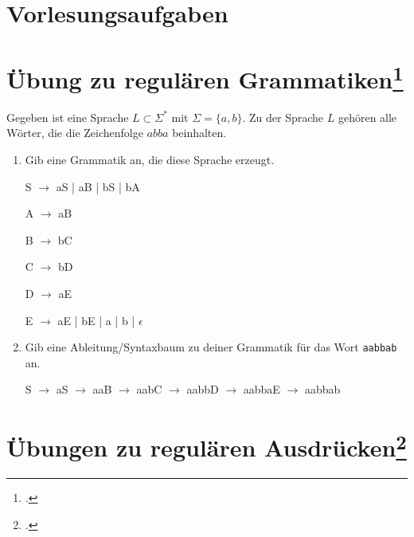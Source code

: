 \documentclass{lehramt-informatik-aufgabe}
\begin{document}
\section{Vorlesungsaufgaben
}

\section{Übung zu regulären Grammatiken\footcite[Seite 21]{theo:fs:1}}

Gegeben ist eine Sprache $L \subset \Sigma^*$ mit $\Sigma = \{a, b\}$. Zu
der Sprache $L$ gehören alle Wörter, die die Zeichenfolge $abba$
beinhalten.

\begin{enumerate}
\item Gib eine Grammatik an, die diese Sprache erzeugt.

\begin{liAntwort}
S $\rightarrow$ aS | aB | bS | bA

A $\rightarrow$ aB

B $\rightarrow$ bC

C $\rightarrow$ bD

D $\rightarrow$ aE

E $\rightarrow$ aE | bE | a | b | $\epsilon$
\end{liAntwort}

\item Gib eine Ableitung/Syntaxbaum zu deiner Grammatik für das Wort
\texttt{aabbab} an.

\begin{liAntwort}
S $\rightarrow$
aS $\rightarrow$
aaB $\rightarrow$
aabC $\rightarrow$
aabbD $\rightarrow$
aabbaE $\rightarrow$
aabbab
\end{liAntwort}
\end{enumerate}

%

\section{Übungen zu regulären Ausdrücken\footcite[Seite 21]{theo:fs:1}}
\end{document}

